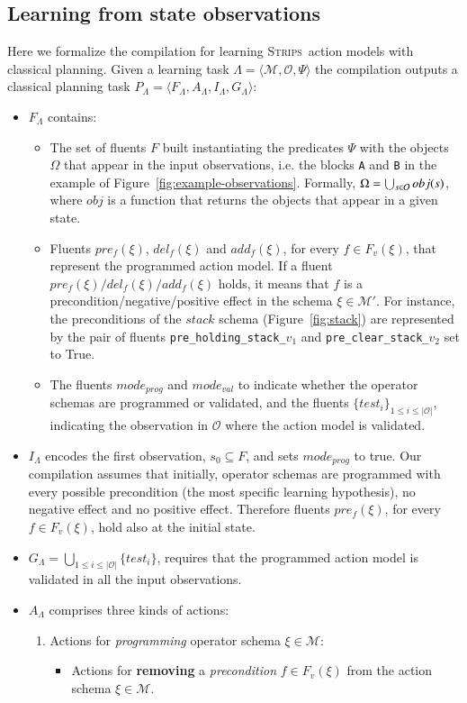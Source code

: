 \documentclass[3p,times]{elsarticle}
\newcommand{\strips}{\textsc{Strips}}     %
\newcommand{\tup}[1]{{\langle #1 \rangle}}
\begin{document}
\subsection{Learning from state observations}
Here we formalize the compilation for learning \strips\ action models with classical planning. Given a learning task $\Lambda=\tup{\mathcal{M},\mathcal{O},\Psi}$ the compilation outputs a classical planning task $P_{\Lambda}=\tup{F_{\Lambda},A_{\Lambda},I_{\Lambda},G_{\Lambda}}$:
\begin{itemize}
\item $F_{\Lambda}$ contains:
\begin{itemize}
\item The set of fluents $F$ built instantiating the predicates $\Psi$ with the objects $\Omega$ that appear in the input observations, i.e. the blocks {\tt\small A} and {\tt\small B} in the example of Figure~\ref{fig:example-observations}. Formally, $\Omega=\bigcup_{\small s\in\mathcal{O}} obj(s)$, where $obj$ is a function that returns the objects that appear in a given state.
\item Fluents $pre_f(\xi)$, $del_f(\xi)$ and $add_f(\xi)$, for every $f\in F_v(\xi)$, that represent the programmed action model. If a fluent $pre_f(\xi)/del_f(\xi)/add_f(\xi)$ holds, it means that $f$ is a precondition/negative/positive effect in the schema $\xi\in \mathcal{M}'$. For instance, the preconditions of the $stack$ schema (Figure~\ref{fig:stack}) are represented by the pair of fluents {\small\tt pre\_holding\_stack\_$v_1$} and {\small\tt pre\_clear\_stack\_$v_2$} set to True.
\item The fluents $mode_{prog}$ and $mode_{val}$ to indicate whether the operator schemas are programmed or validated, and the fluents $\{test_i\}_{1\leq i\leq |\mathcal{O}|}$, indicating the observation in $\mathcal{O}$ where the action model is validated.
\end{itemize}
\item $I_{\Lambda}$ encodes the first observation, $s_0\subseteq F$, and sets $mode_{prog}$ to true. Our compilation assumes that initially, operator schemas are programmed with every possible precondition (the most specific learning hypothesis), no negative effect and no positive effect. Therefore fluents $pre_f(\xi)$, for every $f\in F_v(\xi)$, hold also at the initial state. 

\item $G_{\Lambda}=\bigcup_{1\leq i\leq |\mathcal{O}|}\{test_i\}$, requires that the programmed action model is validated in all the input observations.
\item $A_{\Lambda}$ comprises three kinds of actions:
\begin{enumerate}
\item Actions for {\em programming} operator schema $\xi\in\mathcal{M}$:
\begin{itemize}
\item Actions for {\bf removing} a {\em precondition} $f\in F_v(\xi)$ from the action schema $\xi\in\mathcal{M}$.


\end{itemize}
\end{enumerate}
\end{itemize}
\end{document}
